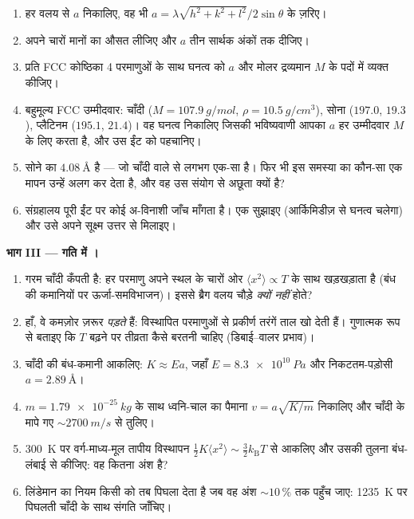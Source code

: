 \begin{problem}
\begin{enumerate}[resume]
  \item हर वलय से  $a$ निकालिए, वह भी
        $a = \lambda\sqrt{h^2+k^2+l^2}/2\sin\theta$ के ज़रिए।
  \item अपने चारों मानों का औसत लीजिए और $a$ तीन सार्थक अंकों तक
        दीजिए।
  \item प्रति FCC कोष्ठिका 4 परमाणुओं के साथ घनत्व को
        $a$ और मोलर द्रव्यमान $M$ के पदों में व्यक्त कीजिए।
  \item बहुमूल्य FCC उम्मीदवार: चाँदी
        ($M = \qty{107.9}{g/mol}$, $\rho = \qty{10.5}{g/cm^3}$),
        सोना ($197.0$, $19.3$), प्लैटिनम ($195.1$, $21.4$)।
        वह घनत्व निकालिए जिसकी भविष्यवाणी आपका $a$ हर उम्मीदवार
        $M$ के लिए करता है, और उस ईंट को पहचानिए।
  \item सोने का  $\qty{4.08}{\angstrom}$ है ---
        जो चाँदी वाले से लगभग एक-सा है। फिर भी इस समस्या का
        कौन-सा एक मापन उन्हें अलग कर देता है, और वह उस संयोग से
        अछूता क्यों है?
  \item संग्रहालय पूरी ईंट पर कोई अ-विनाशी जाँच माँगता है। एक
        सुझाइए (आर्किमिडीज़ से घनत्व चलेगा) और उसे अपने सूक्ष्म
        उत्तर से मिलाइए।
\end{enumerate}

\medskip\noindent\textbf{भाग III --- गति में ।}

\begin{enumerate}[resume]
  \item गरम चाँदी कँपती है: हर परमाणु अपने स्थल के चारों ओर
        $\langle x^2\rangle \propto T$ के साथ खड़खड़ाता है (बंध की
        कमानियों पर ऊर्जा-समविभाजन)। इससे ब्रैग वलय चौड़े
        \emph{क्यों नहीं} होते?
  \item हाँ, वे कमज़ोर ज़रूर \emph{पड़ते} हैं: विस्थापित परमाणुओं से
        प्रकीर्ण तरंगें ताल खो देती हैं। गुणात्मक रूप से बताइए कि
        $T$ बढ़ने पर तीव्रता कैसे बरतनी चाहिए (डिबाई--वालर
        प्रभाव)।
  \item चाँदी की बंध-कमानी आकलिए: $K \approx Ea$, जहाँ
        $E = \qty{8.3e10}{Pa}$ और निकटतम-पड़ोसी
        $a = \qty{2.89}{\angstrom}$।
  \item $m = \qty{1.79e-25}{kg}$ के साथ ध्वनि-चाल का पैमाना
        $v = a\sqrt{K/m}$ निकालिए और चाँदी के मापे गए
        $\sim\qty{2700}{m/s}$ से तुलिए।
  \item \qty{300}{K} पर वर्ग-माध्य-मूल तापीय विस्थापन
        $\tfrac12K\langle x^2\rangle \sim
        \tfrac32k_{\text{B}}T$ से आकलिए और उसकी तुलना बंध-लंबाई से
        कीजिए: वह कितना अंश है?
  \item लिंडेमान का नियम किसी  को तब पिघला देता है जब वह
        अंश $\sim10\,\%$ तक पहुँच जाए: \qty{1235}{K} पर पिघलती
        चाँदी के साथ संगति जाँचिए।
\end{enumerate}


\end{problem}
